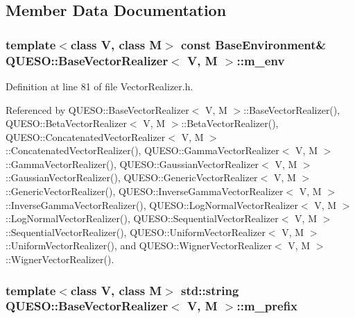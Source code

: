 \subsection{Member Data Documentation}
\hypertarget{class_q_u_e_s_o_1_1_base_vector_realizer_acde246c52f82d8ed687d91cfac14c29c}{
\subsubsection[{m\-\_\-env}]{\setlength{\rightskip}{0pt plus 5cm}template$<$class V, class M$>$ const {\bf Base\-Environment}\& {\bf Q\-U\-E\-S\-O\-::\-Base\-Vector\-Realizer}$<$ V, M $>$\-::m\-\_\-env\hspace{0.3cm}{\ttfamily [protected]}}}\label{class_q_u_e_s_o_1_1_base_vector_realizer_acde246c52f82d8ed687d91cfac14c29c}


Definition at line 81 of file Vector\-Realizer.\-h.



Referenced by Q\-U\-E\-S\-O\-::\-Base\-Vector\-Realizer$<$ V, M $>$\-::\-Base\-Vector\-Realizer(), Q\-U\-E\-S\-O\-::\-Beta\-Vector\-Realizer$<$ V, M $>$\-::\-Beta\-Vector\-Realizer(), Q\-U\-E\-S\-O\-::\-Concatenated\-Vector\-Realizer$<$ V, M $>$\-::\-Concatenated\-Vector\-Realizer(), Q\-U\-E\-S\-O\-::\-Gamma\-Vector\-Realizer$<$ V, M $>$\-::\-Gamma\-Vector\-Realizer(), Q\-U\-E\-S\-O\-::\-Gaussian\-Vector\-Realizer$<$ V, M $>$\-::\-Gaussian\-Vector\-Realizer(), Q\-U\-E\-S\-O\-::\-Generic\-Vector\-Realizer$<$ V, M $>$\-::\-Generic\-Vector\-Realizer(), Q\-U\-E\-S\-O\-::\-Inverse\-Gamma\-Vector\-Realizer$<$ V, M $>$\-::\-Inverse\-Gamma\-Vector\-Realizer(), Q\-U\-E\-S\-O\-::\-Log\-Normal\-Vector\-Realizer$<$ V, M $>$\-::\-Log\-Normal\-Vector\-Realizer(), Q\-U\-E\-S\-O\-::\-Sequential\-Vector\-Realizer$<$ V, M $>$\-::\-Sequential\-Vector\-Realizer(), Q\-U\-E\-S\-O\-::\-Uniform\-Vector\-Realizer$<$ V, M $>$\-::\-Uniform\-Vector\-Realizer(), and Q\-U\-E\-S\-O\-::\-Wigner\-Vector\-Realizer$<$ V, M $>$\-::\-Wigner\-Vector\-Realizer().

\hypertarget{class_q_u_e_s_o_1_1_base_vector_realizer_ac5559b6921816ccaed7afc2d342c2a32}{
\subsubsection[{m\-\_\-prefix}]{\setlength{\rightskip}{0pt plus 5cm}template$<$class V, class M$>$ std\-::string {\bf Q\-U\-E\-S\-O\-::\-Base\-Vector\-Realizer}$<$ V, M $>$\-::m\-\_\-prefix\hspace{0.3cm}{\ttfamily [protected]}}}\label{class_q_u_e_s_o_1_1_base_vector_realizer_ac5559b6921816ccaed7afc2d342c2a32}


